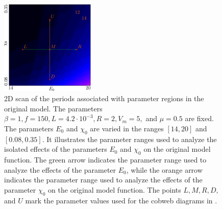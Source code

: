 \begin{figure}
	\centering
	\includegraphics[width=0.4\textwidth]{../Figures/5/5.3/result.png}
	\caption[The parameter ranges examined to analyze the effects of parameters on the original model function]{
		2D scan of the periods associated with parameter regions in the original model.
		The parameters $\beta = 1, f = 150, L = 4.2 \cdot 10^{-3}, R = 2, V_m = 5,$ and $\mu = 0.5$ are fixed.
		The parameters $E_0$ and $\chi_0$ are varied in the ranges $[14, 20]$ and $[0.08, 0.35]$.
		It illustrates the parameter ranges used to analyze the isolated effects of the parameters $E_0$ and $\chi_0$ on the original model function.
		The green arrow indicates the parameter range used to analyze the effects of the parameter $E_0$, while the orange arrow indicates the parameter range used to analyze the effects of the parameter $\chi_0$ on the original model function.
		The points $L, M, R, D,$ and $U$ mark the parameter values used for the cobweb diagrams in .
	}
	\label{fig:setup.char.evolution.single.map}
\end{figure}

